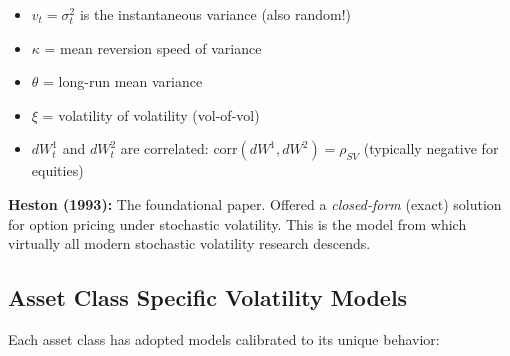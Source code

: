 \documentclass[12pt,openany]{book}
\theoremstyle{definition}
\theoremstyle{remark}
\begin{document}
\begin{itemize}
\item $v_t = \sigma_t^2$ is the instantaneous variance (also random!)


\item $\kappa$ = mean reversion speed of variance


\item $\theta$ = long-run mean variance


\item $\xi$ = volatility of volatility (vol-of-vol)


\item $dW_t^1$ and $dW_t^2$ are correlated: $\text{corr}(dW^1, dW^2) = \rho_{SV}$ (typically negative for equities)


\end{itemize}
\textbf{Heston (1993):} The foundational paper. Offered a \emph{closed-form} (exact) solution for option pricing under stochastic volatility. This is the model from which virtually all modern stochastic volatility research descends.

\medskip
\subsection{Asset Class Specific Volatility Models}
Each asset class has adopted models calibrated to its unique behavior:
\end{document}
